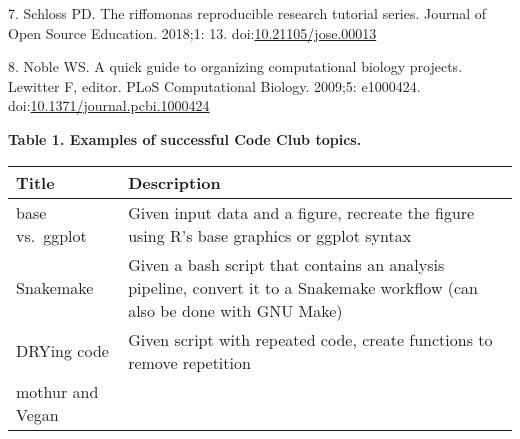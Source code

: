 \documentclass[
  11pt,
]{article}
\begin{document}
\leavevmode\hypertarget{ref-Schloss_2018}{}%
7. Schloss PD. The riffomonas reproducible research tutorial series.
Journal of Open Source Education. 2018;1: 13.
doi:\href{https://doi.org/10.21105/jose.00013}{10.21105/jose.00013}

\leavevmode\hypertarget{ref-Noble2009}{}%
8. Noble WS. A quick guide to organizing computational biology projects.
Lewitter F, editor. PLoS Computational Biology. 2009;5: e1000424.
doi:\href{https://doi.org/10.1371/journal.pcbi.1000424}{10.1371/journal.pcbi.1000424}

\newpage

\textbf{Table 1. Examples of successful Code Club topics.}

\begin{longtable}[]{@{}ll@{}}
\toprule
\begin{minipage}[b]{0.25\columnwidth}\raggedright
\textbf{Title}\strut
\end{minipage} & \begin{minipage}[b]{0.69\columnwidth}\raggedright
\textbf{Description}\strut
\end{minipage}\tabularnewline
\midrule
\endhead
\begin{minipage}[t]{0.25\columnwidth}\raggedright
base vs.~ggplot\strut
\end{minipage} & \begin{minipage}[t]{0.69\columnwidth}\raggedright
Given input data and a figure, recreate the figure using R's base
graphics or ggplot syntax\strut
\end{minipage}\tabularnewline
\begin{minipage}[t]{0.25\columnwidth}\raggedright
Snakemake\strut
\end{minipage} & \begin{minipage}[t]{0.69\columnwidth}\raggedright
Given a bash script that contains an analysis pipeline, convert it to a
Snakemake workflow (can also be done with GNU Make)\strut
\end{minipage}\tabularnewline
\begin{minipage}[t]{0.25\columnwidth}\raggedright
DRYing code\strut
\end{minipage} & \begin{minipage}[t]{0.69\columnwidth}\raggedright
Given script with repeated code, create functions to remove
repetition\strut
\end{minipage}\tabularnewline
\begin{minipage}[t]{0.25\columnwidth}\raggedright
mothur and Vegan\strut
\end{minipage} & \begin{minipage}[t]{0.69\columnwidth}\raggedright

\end{minipage}
\end{longtable}
\end{document}
